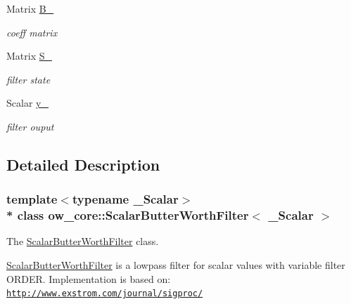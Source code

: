 \begin{DoxyCompactItemize}
\item 
Matrix \hyperlink{classow__core_1_1ScalarButterWorthFilter_a1ad475c9e172449aa91e1433a7d8c65d}{B\+\_\+}\hypertarget{classow__core_1_1ScalarButterWorthFilter_a1ad475c9e172449aa91e1433a7d8c65d}{}\label{classow__core_1_1ScalarButterWorthFilter_a1ad475c9e172449aa91e1433a7d8c65d}

\begin{DoxyCompactList}\small\item\em coeff matrix \end{DoxyCompactList}\item 
Matrix \hyperlink{classow__core_1_1ScalarButterWorthFilter_a496802b3d289e1fa9da06a4429657a62}{S\+\_\+}\hypertarget{classow__core_1_1ScalarButterWorthFilter_a496802b3d289e1fa9da06a4429657a62}{}\label{classow__core_1_1ScalarButterWorthFilter_a496802b3d289e1fa9da06a4429657a62}

\begin{DoxyCompactList}\small\item\em filter state \end{DoxyCompactList}\item 
Scalar \hyperlink{classow__core_1_1ScalarButterWorthFilter_ad245cd5c03697d0d3e4af454e84a357d}{y\+\_\+}\hypertarget{classow__core_1_1ScalarButterWorthFilter_ad245cd5c03697d0d3e4af454e84a357d}{}\label{classow__core_1_1ScalarButterWorthFilter_ad245cd5c03697d0d3e4af454e84a357d}

\begin{DoxyCompactList}\small\item\em filter ouput \end{DoxyCompactList}\end{DoxyCompactItemize}


\subsection{Detailed Description}
\subsubsection*{template$<$typename \+\_\+\+Scalar$>$\\*
class ow\+\_\+core\+::\+Scalar\+Butter\+Worth\+Filter$<$ \+\_\+\+Scalar $>$}

The \hyperlink{classow__core_1_1ScalarButterWorthFilter}{Scalar\+Butter\+Worth\+Filter} class. 

\hyperlink{classow__core_1_1ScalarButterWorthFilter}{Scalar\+Butter\+Worth\+Filter} is a lowpass filter for scalar values with variable filter O\+R\+D\+ER. Implementation is based on\+: \href{http://www.exstrom.com/journal/sigproc/}{\tt http\+://www.\+exstrom.\+com/journal/sigproc/} 

